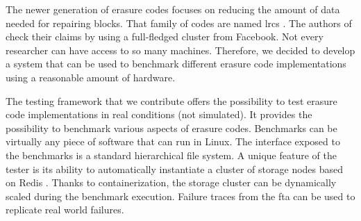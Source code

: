 The newer generation of erasure codes focuses on reducing the amount of data needed for repairing blocks.
That family of codes are named \acp{lrc} \autocite{lrc}.
The authors of \autocite{XorbasVLDB} check their claims by using a full-fledged cluster from Facebook.
Not every researcher can have access to so many machines. 
Therefore, we decided to develop a system that can be used to benchmark different erasure code implementations using a reasonable amount of hardware. 

The testing framework that we contribute offers the possibility to test erasure code implementations in real conditions (not simulated).
It provides the possibility to benchmark various aspects of erasure codes.
Benchmarks can be virtually any piece of software that can run in Linux.
The interface exposed to the benchmarks is a standard hierarchical file system.
A unique feature of the tester is its ability to automatically instantiate a cluster of storage nodes based on Redis \autocite{redis}.
Thanks to containerization, the storage cluster can be dynamically scaled during the benchmark execution.
Failure traces from the \ac{fta} \autocite{fta-journal,fta-paper} can be used to replicate real world failures. 


